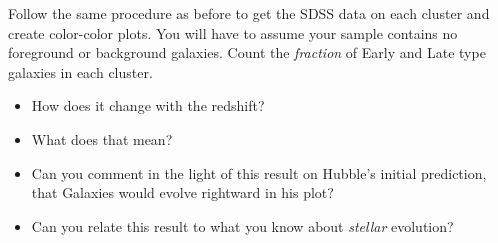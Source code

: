 \noindent
Follow the same procedure as before to get the SDSS data on each cluster and create color-color plots. You will have to assume your sample contains no foreground or background galaxies. Count the \emph{fraction} of Early and Late type galaxies in each cluster. 
\begin{itemize}
\item{How does it change with the redshift? }
\vspace{30pt}
\item{What does that mean?}
\vspace{30pt}
\item{Can you comment in the light of this result on Hubble's initial prediction, that Galaxies would evolve rightward in his plot?}
\vspace{30pt}
\item{ Can you relate this result to what you know about \emph{stellar} evolution?}
\end{itemize}

